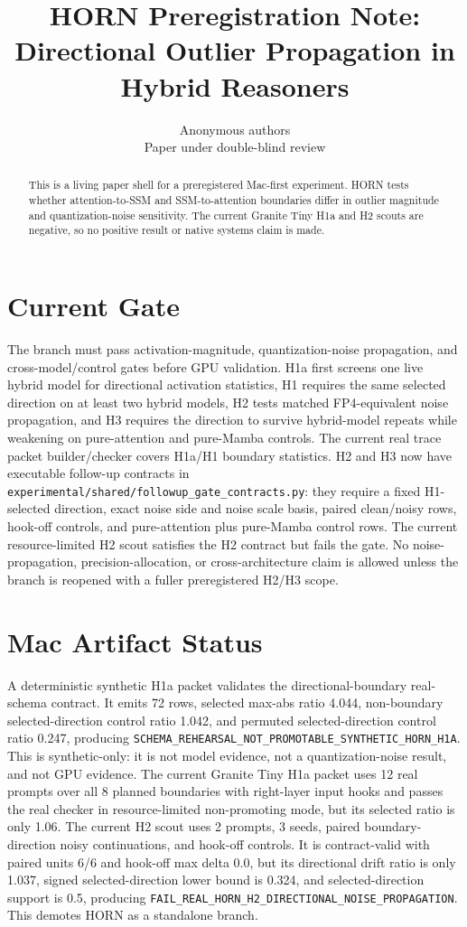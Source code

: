 \documentclass{article}
\title{HORN Preregistration Note: Directional Outlier Propagation in Hybrid Reasoners}
\author{Anonymous authors\\Paper under double-blind review}
\begin{document}
\maketitle

\begin{abstract}
This is a living paper shell for a preregistered Mac-first experiment. HORN
tests whether attention-to-SSM and SSM-to-attention boundaries differ in
outlier magnitude and quantization-noise sensitivity. The current Granite Tiny
H1a and H2 scouts are negative, so no positive result or native systems claim is
made.
\end{abstract}

\section{Current Gate}

The branch must pass activation-magnitude, quantization-noise propagation, and
cross-model/control gates before GPU validation.
H1a first screens one live hybrid model for directional activation statistics,
H1 requires the same selected direction on at least two hybrid models, H2 tests matched
FP4-equivalent noise propagation, and H3 requires the direction to survive
hybrid-model repeats while weakening on pure-attention and pure-Mamba controls.
The current real trace packet builder/checker covers H1a/H1 boundary
statistics. H2 and H3 now have executable follow-up contracts in
\texttt{experimental/shared/followup\_gate\_contracts.py}: they require a fixed
H1-selected direction, exact noise side and noise scale basis, paired
clean/noisy rows, hook-off controls, and pure-attention plus pure-Mamba control
rows. The current resource-limited H2 scout satisfies the H2 contract but
fails the gate. No noise-propagation, precision-allocation, or
cross-architecture claim is allowed unless the branch is reopened with a fuller
preregistered H2/H3 scope.

\section{Mac Artifact Status}

A deterministic synthetic H1a packet validates the directional-boundary
real-schema contract. It emits 72 rows, selected max-abs ratio 4.044,
non-boundary selected-direction control ratio 1.042, and permuted
selected-direction control ratio 0.247, producing
\texttt{SCHEMA\_REHEARSAL\_NOT\_PROMOTABLE\_SYNTHETIC\_HORN\_H1A}. This is
synthetic-only: it is not model evidence, not a quantization-noise result, and
not GPU evidence.
The current Granite Tiny H1a packet uses 12 real prompts over all 8 planned
boundaries with right-layer input hooks and passes the real checker in
resource-limited non-promoting mode, but its selected ratio is only 1.06. The
current H2 scout uses 2 prompts, 3 seeds, paired boundary-direction noisy
continuations, and hook-off controls. It is contract-valid with paired units
6/6 and hook-off max delta 0.0, but its directional drift ratio is only 1.037,
signed selected-direction lower bound is 0.324, and selected-direction support
is 0.5,
producing
\texttt{FAIL\_REAL\_HORN\_H2\_DIRECTIONAL\_NOISE\_PROPAGATION}. This demotes
HORN as a standalone branch.
\end{document}
